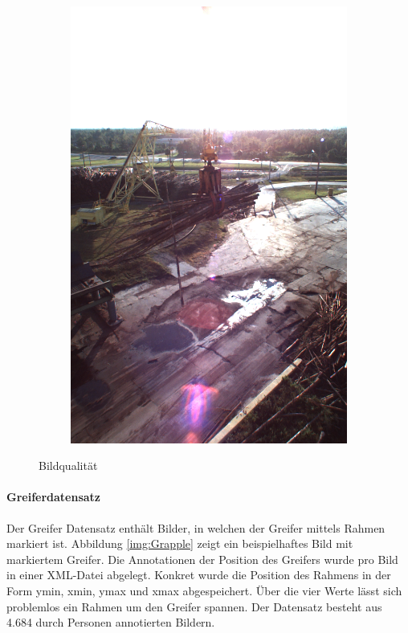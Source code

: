 \begin{figure}[h]
\begin{subfigure}[c]{0.24\textwidth}
			\includegraphics[width=1\textwidth]{bilder/Grundlagen/Daten_Bildqualitaet/Reflexionen.png}
		\end{subfigure}
		\caption{Bildqualität}
		\label{img:Bildqualität}
	\end{figure}
		
	\paragraph{Greiferdatensatz} Der Greifer Datensatz enthält Bilder, in welchen der Greifer mittels Rahmen markiert ist. Abbildung \ref{img:Grapple} zeigt ein beispielhaftes Bild mit markiertem Greifer. Die Annotationen der Position des Greifers wurde pro Bild in einer XML-Datei abgelegt. Konkret wurde die Position des Rahmens in der Form ymin, xmin, ymax und xmax abgespeichert. Über die vier Werte lässt sich problemlos ein Rahmen um den Greifer spannen. Der Datensatz besteht aus 4.684 durch Personen annotierten Bildern.
	
